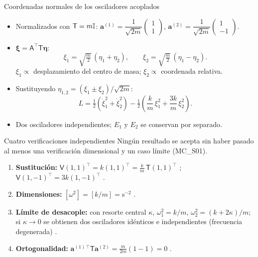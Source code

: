 \documentclass[spanish,10pt]{beamer}
\newcommand{\Tm}{\mathsf{T}}                 %
\newcommand{\Vm}{\mathsf{V}}                 %
\newcommand{\Am}{\mathsf{A}}                 %
\newcommand{\ev}{\bm{\eta}}                  %
\newcommand{\xiv}{\bm{\xi}}                  %
\newcommand{\av}[1]{\mathbf{a}^{(#1)}}       %
\newcommand{\tr}{^{\top}}                    %
\newcommand{\ok}{\checkmark}
\begin{document}
\begin{frame}{Coordenadas normales de los osciladores acoplados}
\begin{itemize}[<+->]
  \item Normalizados con $\Tm=m\Id$: \quad $\av1=\dfrac{1}{\sqrt{2m}}\begin{pmatrix}1\\1\end{pmatrix}$, \quad $\av2=\dfrac{1}{\sqrt{2m}}\begin{pmatrix}1\\-1\end{pmatrix}$.
  \item $\xiv=\Am\tr\Tm\ev$:
  \[
  \xi_1=\sqrt{\tfrac m2}\,(\eta_1+\eta_2),\qquad \xi_2=\sqrt{\tfrac m2}\,(\eta_1-\eta_2).
  \]
  $\xi_1\propto$ desplazamiento del centro de masa; $\xi_2\propto$ coordenada relativa.
  \item Sustituyendo $\eta_{1,2}=(\xi_1\pm\xi_2)/\sqrt{2m}$:
  \[
  L=\tfrac12\left(\dot\xi_1^2+\dot\xi_2^2\right)-\tfrac12\left(\frac km\,\xi_1^2+\frac{3k}m\,\xi_2^2\right).
  \]
  \item Dos osciladores independientes; $E_1$ y $E_2$ se conservan por separado.
\end{itemize}
\end{frame}

\begin{frame}{Cuatro verificaciones independientes}
Ningún resultado se acepta sin haber pasado al menos una verificación dimensional y un caso límite (MC\_S01).
\begin{enumerate}[<+->]
  \item \textbf{Sustitución:} $\Vm(1,1)\tr=k(1,1)\tr=\frac km\,\Tm(1,1)\tr$ \ok; \quad $\Vm(1,-1)\tr=3k(1,-1)\tr$ \ok.
  \item \textbf{Dimensiones:} $[\omega^2]=[k/m]=\mathrm{s}^{-2}$ \ok.
  \item \textbf{Límite de desacople:} con resorte central $\kappa$, $\omega_1^2=k/m$, $\omega_2^2=(k+2\kappa)/m$; si $\kappa\to0$ se obtienen dos osciladores idénticos e independientes (frecuencia degenerada) \ok.
  \item \textbf{Ortogonalidad:} $\av1{}\tr\Tm\av2=\frac{m}{2m}(1-1)=0$ \ok.
\end{enumerate}
\end{frame}
\end{document}
